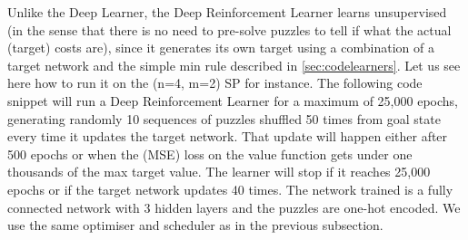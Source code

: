 \label{DRLSS}

Unlike the Deep Learner, the Deep Reinforcement Learner learns unsupervised (in the sense that there is no need to pre-solve puzzles to tell if what the actual (target) costs are), since it generates its own target using a combination of a target network and the simple min rule described in \ref{sec:codelearners}. Let us see here how to run it on the (n=4, m=2) SP for instance. The following code snippet will run a Deep Reinforcement Learner for a maximum of 25,000 epochs, generating randomly 10 sequences of puzzles shuffled 50 times from goal state every time it updates the target network. That update will happen either after 500 epochs or when the (MSE) loss on the value function gets under one thousands of the max target value. The learner will stop if it reaches 25,000 epochs or if the target network updates 40 times. The network trained is a fully connected network with 3 hidden layers and the puzzles are one-hot encoded. We use the same optimiser and scheduler as in the previous subsection.

\afblue
